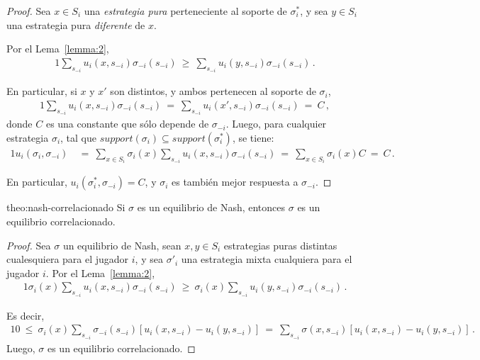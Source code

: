 \begin{proof}
Sea $x \in S_i$ una \emph{estrategia pura} perteneciente al soporte de $\sigma^*_i$, y sea $y \in S_i$ una estrategia pura \emph{diferente} de $x$. 

Por el Lema~\ref{lemma:2},
\begin{alignat}{1}
  \sum_{s_{-i}} u_i(x,s_{-i}) \sigma_{-i}(s_{-i})\ \geq\  \sum_{s_{-i}} u_i(y,s_{-i}) \sigma_{-i}(s_{-i}) \,.
\end{alignat}

En particular, si $x$ y $x'$ son distintos, y ambos pertenecen al soporte de $\sigma_i$,
\begin{alignat}{1}
\sum_{s_{-i}} u_i(x,s_{-i}) \sigma_{-i}(s_{-i})\ =\ \sum_{s_{-i}} u_i(x',s_{-i}) \sigma_{-i}(s_{-i})\ =\ C \,,
\end{alignat}
donde $C$ es una constante que s\'olo depende de $\sigma_{-i}$.
Luego, para cualquier estrategia $\sigma_i$, tal que $support(\sigma_i) \subseteq support(\sigma^*_i)$, se tiene:
\begin{alignat}{1}
u_i(\sigma_i, \sigma_{-i})\ &=\ \sum_{x \in S_i} \sigma_i(x) \sum_{s_{-i}} u_i(x,s_{-i}) \sigma_{-i}(s_{-i})\ =\ \sum_{x \in S_i} \sigma_i(x) C\ =\ C \,.
\end{alignat}

En particular, $u_i(\sigma^*_i,\sigma_{-i})=C$, y $\sigma_i$ es también mejor respuesta a $\sigma_{-i}$.
\end{proof}

\begin{reptheorem}{theo:nash-correlacionado}
Si $\sigma$ es un equilibrio de Nash, entonces $\sigma$ es un equilibrio correlacionado.
\end{reptheorem}

\begin{proof}
Sea $\sigma$ un equilibrio de Nash, sean $x,y\in S_i$ estrategias puras distintas cualesquiera para el jugador $i$, y sea $\sigma'_i$ una estrategia mixta cualquiera para el jugador $i$. Por el Lema~\ref{lemma:2},
\begin{alignat}{1}
  \sigma_i(x) \sum_{s_{-i}} u_i(x,s_{-i}) \sigma_{-i}(s_{-i})\ \geq\  \sigma_i(x)\sum_{s_{-i}} u_i(y,s_{-i}) \sigma_{-i}(s_{-i}) \,.
\end{alignat}

Es decir,
\begin{alignat}{1}
  0\ \leq\ \sigma_i(x) \sum_{s_{-i}} \sigma_{-i}(s_{-i}) [u_i(x,s_{-i}) - u_i(y,s_{-i})]\ =\ \sum_{s_{-i}} \sigma(x,s_{-i}) [u_i(x,s_{-i}) - u_i(y,s_{-i})] \,.
\end{alignat}
Luego, $\sigma$ es un equilibrio correlacionado.
\end{proof}

